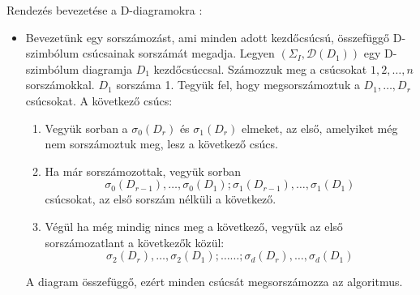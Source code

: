 \documentclass[12pt,magyar,a4paper]{article}
\begin{document}
Rendezés bevezetése a D-diagramokra \cite{Emil}:
\begin{itemize}
  \item Bevezetünk egy sorszámozást, ami minden adott kezdőcsúcsú, összefüggő
    D-szimbólum csúcsainak sorszámát megadja.
    Legyen $(\Sigma_I,\mathcal{D}(D_1))$ egy D-szimbólum diagramja $D_1$
    kezdőcsúccsal. Számozzuk meg a csúcsokat $1,2,\ldots ,n$ sorszámokkal.
    $D_1$ sorszáma 1. Tegyük fel, hogy megsorszámoztuk a $D_1,\ldots,D_r$
    csúcsokat. A következő csúcs:
    \begin{enumerate}
      \item Vegyük sorban a $\sigma_0(D_r)$ és $\sigma_1(D_r)$ elmeket, az első,
	amelyiket még nem sorszámoztuk meg, lesz a következő csúcs.
      \item Ha már sorszámozottak, vegyük sorban
	\begin{equation*}
	  \sigma_0(D_{r-1}),\ldots,\sigma_0(D_1);\sigma_1(D_{r-1}),\ldots, \sigma_1(D_1)
	\end{equation*}
	csúcsokat, az első sorszám nélküli a következő.
      \item Végül ha még mindig nincs meg a következő, vegyük az első
	sorszámozatlant a következők közül:
	\begin{equation*}
	  \sigma_2(D_r),\ldots,\sigma_2(D_1); \ldots\ldots; \sigma_d(D_r),\ldots,\sigma_d(D_1)
	\end{equation*}
    \end{enumerate}

    A diagram összefüggő, ezért minden csúcsát megsorszámozza az algoritmus.


\end{itemize}
\end{document}
